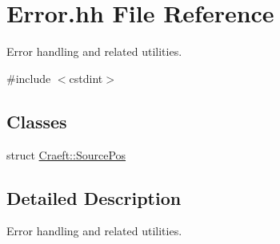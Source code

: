 \hypertarget{_error_8hh}{}\section{Error.\+hh File Reference}
\label{_error_8hh}


Error handling and related utilities.  


{\ttfamily \#include $<$cstdint$>$}\newline
\subsection*{Classes}
\begin{DoxyCompactItemize}
\item 
struct \hyperlink{struct_craeft_1_1_source_pos}{Craeft\+::\+Source\+Pos}
\end{DoxyCompactItemize}


\subsection{Detailed Description}
Error handling and related utilities. 

